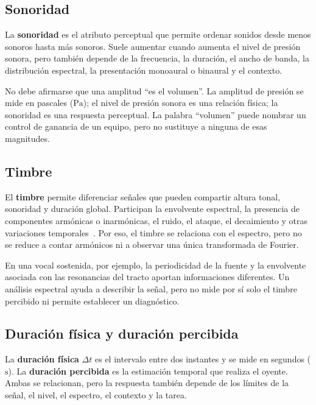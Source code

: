 \subsection{Sonoridad}
\label{sec:u7-sonoridad}

La \textbf{sonoridad} es el atributo perceptual que permite ordenar sonidos
desde menos sonoros hasta más sonoros. Suele aumentar cuando aumenta el nivel
de presión sonora, pero también depende de la frecuencia, la duración, el
ancho de banda, la distribución espectral, la presentación monoaural o
binaural y el contexto.

No debe afirmarse que una amplitud ``es el volumen''. La amplitud de presión
se mide en pascales (\(\text{Pa}\)); el nivel de presión sonora es una relación
física; la sonoridad es una respuesta perceptual. La palabra ``volumen'' puede
nombrar un control de ganancia de un equipo, pero no sustituye a ninguna de
esas magnitudes.

\subsection{Timbre}
\label{sec:u7-timbre}

El \textbf{timbre} permite diferenciar señales que pueden compartir altura
tonal, sonoridad y duración global. Participan la envolvente
espectral, la presencia de componentes armónicas o inarmónicas, el ruido, el
ataque, el decaimiento y otras variaciones temporales~\cite{oxenham2018}. Por eso, el timbre se
relaciona con el espectro, pero no se reduce a contar armónicos ni a observar
una única transformada de Fourier.

En una vocal sostenida, por ejemplo, la periodicidad de la fuente y la
envolvente asociada con las resonancias del tracto aportan informaciones
diferentes. Un análisis espectral ayuda a describir la señal, pero no mide por
sí solo el timbre percibido ni permite establecer un diagnóstico.

\subsection{Duración física y duración percibida}
\label{sec:u7-duracion}

La \textbf{duración física} \(\Delta t\) es el intervalo entre dos instantes y
se mide en segundos (\(\text{s}\)). La \textbf{duración percibida} es la
estimación temporal que realiza el oyente. Ambas se relacionan, pero la
respuesta también depende de los límites de la señal, el nivel, el espectro,
el contexto y la tarea.

